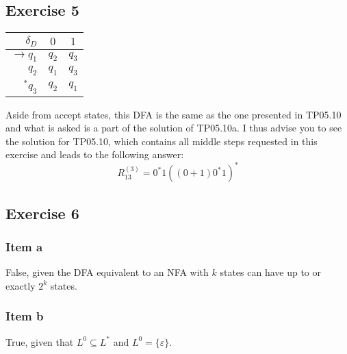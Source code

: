 \documentclass[docid=TP06]{tcom_TP}
\begin{document}
{\subsection{Exercise 5}
\begin{center} \begin{tabular}{r | c c}
	$\delta_D       $ & $0  $ & $1  $ \\ \hline
	$\rightarrow q_1$ & $q_2$ & $q_3$\\
	$            q_2$ & $q_1$ & $q_3$\\
	$         ^* q_3$ & $q_2$ & $q_1$
\end{tabular} \end{center}
Aside from accept states, this DFA is the same as the one presented in TP05.10 and what is asked is a part of the solution of TP05.10a. I thus advise you to see the solution for TP05.10, which contains all middle steps requested in this exercise and leads to the following answer:
\begin{equation*}
	R_{13}^{(3)} = 0^*1((0+1)0^*1)^*
\end{equation*}
\subsection{Exercise 6}
\subsubsection{Item a}
False, given the DFA equivalent to an NFA with $k$ states can have up to or exactly $2^k$ states.
\subsubsection{Item b}
True, given that $L^0 \subseteq L^*$ and $L^0=\{\varepsilon\}$.
}
\end{document}
